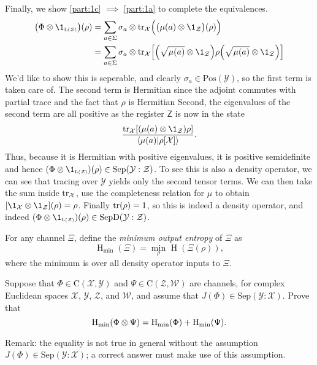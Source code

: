 \documentclass[boxes,pages,color=SeaGreen]{homework}
\newcommand{\tinyspace}{\mspace{1mu}}
\renewcommand{\op}[1]{\operatorname{#1}}
\newcommand{\X}{\mathcal{X}}
\newcommand{\Y}{\mathcal{Y}}
\newcommand{\Z}{\mathcal{Z}}
\newcommand{\W}{\mathcal{W}}
\newcommand{\reg}[1]{\mathsf{#1}}
\newcommand{\Lin}{\mathrm{L}}
\newcommand{\Pos}{\mathrm{Pos}}
\newcommand{\Channel}{\mathrm{C}}
\newcommand{\Sep}{\mathrm{Sep}}
\newcommand{\SepD}{\mathrm{SepD}}
\begin{document}
\begin{solution}
  Finally, we show \ref{part:1c} $\implies$ \ref{part:1a} to complete the equivalences.
  \begin{align*}
    \qty\big(\Phi\otimes\1_\mathsmaller{\Lin(\Z)})(\rho) & = \sum_{a\in\Sigma}\sigma_a\otimes \tr_\X\!\qty\Big(\qty\big(\mu(a)\otimes\1_\Z)(\rho))                               \\
                                                         & = \sum_{a\in\Sigma}\sigma_a\otimes \tr_\X\!\qty[\qty(\sqrt{\mu(a)}\otimes\1_\Z) \rho \qty(\sqrt{\mu(a)}\otimes\1_\Z)]
  \end{align*}
  We'd like to show this is seperable, and clearly $\sigma_a\in\Pos(\Y)$, so the first term is taken care of.
  The second term is Hermitian since the adjoint commutes with partial trace and the fact that $\rho$ is Hermitian
  Second, the eigenvalues of the second term are all positive as the register $\reg{Z}$ is now in the state
  \begin{equation*}
    \frac{\tr_\X\!\qty[\qty(\mu(a)\otimes\1_\Z)\rho]}{\ip{\mu(a)}{\rho[\X]}}.
  \end{equation*}
  Thus, because it is Hermitian with positive eigenvalues, it is positive semidefinite and hence $(\Phi\otimes\1_\mathsmaller{\Lin(\Z)})(\rho)\in\Sep(\Y:\Z)$.
  To see this is also a density operator, we can see that tracing over $\Y$ yields only the second tensor terms.
  We can then take the sum inside $\tr_\X$, use the completeness relation for $\mu$ to obtain $[\1_\X\otimes\1_\Z](\rho) = \rho$.
  Finally $\tr(\rho) = 1$, so this is indeed a density operator, and indeed $(\Phi\otimes\1_\mathsmaller{\Lin(\Z)})(\rho)\in\SepD(\Y:\Z)$.
\end{solution}

\begin{problem}
For any channel $\Xi$, define the \emph{minimum output entropy} of $\Xi$ as
\[
  \op{H}_{\text{min}}(\Xi) = \min_{\rho} \tinyspace \op{H}(\Xi(\rho)),
\]
where the minimum is over all density operator inputs to $\Xi$.

Suppose that $\Phi\in\Channel(\X, \Y)$ and $\Psi\in\Channel(\Z, \W)$ are
channels, for complex Euclidean spaces $\X$, $\Y$, $\Z$, and $\W$, and assume
that $J(\Phi)\in\Sep(\Y \mathbin{:} \X)$.
Prove that
\[
  \op{H}_{\text{min}}(\Phi\otimes\Psi) =
  \op{H}_{\text{min}}(\Phi) + \op{H}_{\textup{min}}(\Psi).
\]

Remark: the equality is not true in general without the assumption
$J(\Phi)\in\Sep(\Y \mathbin{:} \X)$; a correct answer must make use of this
assumption.
\end{problem}
\end{document}
